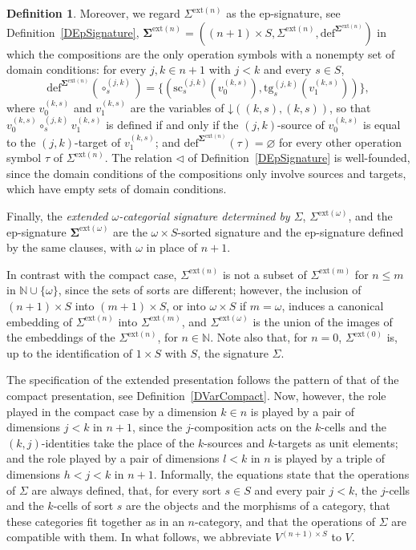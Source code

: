 \documentclass{amsart}
\newcommand{\vs}[1]{\mathbin{\downarrow}#1}
\theoremstyle{plain}
\theoremstyle{definition}
\newtheorem{definition}[theorem]{Definition}
\begin{document}
\begin{definition}
Moreover, we regard $\Sigma^{\mathrm{ext}(n)}$ as the ep-signature, see Definition~\ref{DEpSignature}, $\mathbf{\Sigma}^{\mathrm{ext}(n)}=((n+1)\times S,\Sigma^{\mathrm{ext}(n)},\mathrm{def}^{\mathbf{\Sigma}^{\mathrm{ext}(n)}})$ in which the compositions are the only operation symbols with a nonempty set of domain conditions: for every $j,k\in n+1$ with $j<k$ and every $s\in S$,
$$
\mathrm{def}^{\mathbf{\Sigma}^{\mathrm{ext}(n)}}(\circ^{(j,k)}_{s})=\{(\mathrm{sc}^{(j,k)}_{s}(v^{(k,s)}_{0}),\mathrm{tg}^{(j,k)}_{s}(v^{(k,s)}_{1}))\},
$$
where $v^{(k,s)}_{0}$ and $v^{(k,s)}_{1}$ are the variables of $\vs{((k,s),(k,s))}$, so that $v^{(k,s)}_{0}\circ^{(j,k)}_{s}v^{(k,s)}_{1}$ is defined if and only if the $(j,k)$-source of $v^{(k,s)}_{0}$ is equal to the $(j,k)$-target of $v^{(k,s)}_{1}$; and $\mathrm{def}^{\mathbf{\Sigma}^{\mathrm{ext}(n)}}(\tau)=\varnothing$ for every other operation symbol $\tau$ of $\Sigma^{\mathrm{ext}(n)}$. The relation $\lhd$ of Definition~\ref{DEpSignature} is well-founded, since the domain conditions of the compositions only involve sources and targets, which have empty sets of domain conditions.

Finally, the \emph{extended $\omega$-categorial signature determined by $\Sigma$}, $\Sigma^{\mathrm{ext}(\omega)}$, and the ep-signature $\mathbf{\Sigma}^{\mathrm{ext}(\omega)}$ are the $\omega\times S$-sorted signature and the ep-signature defined by the same clauses, with $\omega$ in place of $n+1$.
\end{definition}

In contrast with the compact case, $\Sigma^{\mathrm{ext}(n)}$ is not a subset of $\Sigma^{\mathrm{ext}(m)}$ for $n\leq m$ in $\mathbb{N}\cup\{\omega\}$, since the sets of sorts are different; however, the inclusion of $(n+1)\times S$ into $(m+1)\times S$, or into $\omega\times S$ if $m=\omega$, induces a canonical embedding of $\Sigma^{\mathrm{ext}(n)}$ into $\Sigma^{\mathrm{ext}(m)}$, and $\Sigma^{\mathrm{ext}(\omega)}$ is the union of the images of the embeddings of the $\Sigma^{\mathrm{ext}(n)}$, for $n\in\mathbb{N}$. Note also that, for $n=0$, $\Sigma^{\mathrm{ext}(0)}$ is, up to the identification of $1\times S$ with $S$, the signature $\Sigma$.

The specification of the extended presentation follows the pattern of that of the compact presentation, see Definition~\ref{DVarCompact}. Now, however, the role played in the compact case by a dimension $k\in n$ is played by a pair of dimensions $j<k$ in $n+1$, since the $j$-composition acts on the $k$-cells and the $(k,j)$-identities take the place of the $k$-sources and $k$-targets as unit elements; and the role played by a pair of dimensions $l<k$ in $n$ is played by a triple of dimensions $h<j<k$ in $n+1$. Informally, the equations state that the operations of $\Sigma$ are always defined, that, for every sort $s\in S$ and every pair $j<k$, the $j$-cells and the $k$-cells of sort $s$ are the objects and the morphisms of a category, that these categories fit together as in an $n$-category, and that the operations of $\Sigma$ are compatible with them. In what follows, we abbreviate $V^{(n+1)\times S}$ to $V$.
\end{document}
